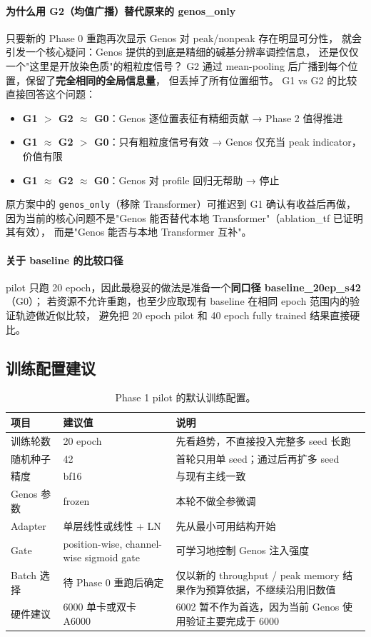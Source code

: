 \documentclass[11pt,a4paper]{ctexart}
\begin{document}
\paragraph{为什么用 G2（均值广播）替代原来的 genos\_only}
只要新的 Phase 0 重跑再次显示 Genos 对 peak/nonpeak 存在明显可分性，
就会引发一个核心疑问：Genos 提供的到底是精细的碱基分辨率调控信息，
还是仅仅一个"这里是开放染色质"的粗粒度信号？
G2 通过 mean-pooling 后广播到每个位置，保留了\textbf{完全相同的全局信息量}，
但丢掉了所有位置细节。
G1 vs G2 的比较直接回答这个问题：

\begin{itemize}[leftmargin=2em]
  \item \textbf{G1 $>$ G2 $\approx$ G0}：Genos 逐位置表征有精细贡献 → Phase 2 值得推进
  \item \textbf{G1 $\approx$ G2 $>$ G0}：只有粗粒度信号有效 → Genos 仅充当 peak indicator，价值有限
  \item \textbf{G1 $\approx$ G2 $\approx$ G0}：Genos 对 profile 回归无帮助 → 停止
\end{itemize}

原方案中的 \texttt{genos\_only}（移除 Transformer）可推迟到 G1 确认有收益后再做，
因为当前的核心问题不是"Genos 能否替代本地 Transformer"（ablation\_tf 已证明其有效），
而是"Genos 能否与本地 Transformer 互补"。

\paragraph{关于 baseline 的比较口径}
pilot 只跑 20 epoch，因此最稳妥的做法是准备一个\textbf{同口径 baseline\_20ep\_s42}（G0）；
若资源不允许重跑，也至少应取现有 baseline 在相同 epoch 范围内的验证轨迹做近似比较，
避免把 20 epoch pilot 和 40 epoch fully trained 结果直接硬比。

\subsection{训练配置建议}

\begin{table}[H]
\centering
\small
\caption{Phase 1 pilot 的默认训练配置。}
\label{tab:phase1_train}
\begin{tabularx}{\textwidth}{l l Y}
\toprule
项目 & 建议值 & 说明 \\
\midrule
训练轮数 & 20 epoch & 先看趋势，不直接投入完整多 seed 长跑 \\
随机种子 & 42 & 首轮只用单 seed；通过后再扩多 seed \\
精度 & bf16 & 与现有主线一致 \\
Genos 参数 & frozen & 本轮不做全参微调 \\
Adapter & 单层线性或线性 + LN & 先从最小可用结构开始 \\
Gate & position-wise, channel-wise sigmoid gate & 可学习地控制 Genos 注入强度 \\
Batch 选择 & 待 Phase 0 重跑后确定 & 仅以新的 throughput / peak memory 结果作为预算依据，不继续沿用旧数值 \\
硬件建议 & 6000 单卡或双卡 A6000 & 6002 暂不作为首选，因为当前 Genos 使用验证主要完成于 6000 \\
\bottomrule
\end{tabularx}
\end{table}
\end{document}
